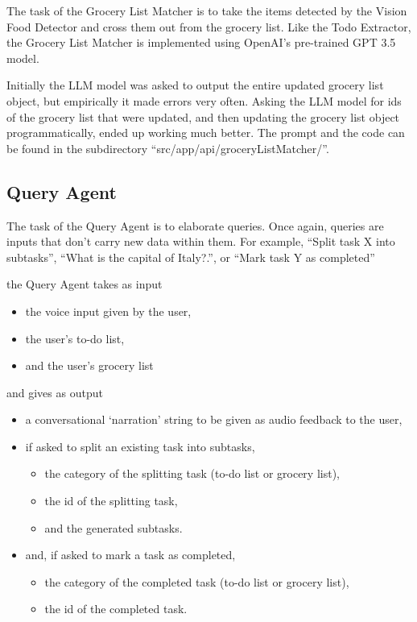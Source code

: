 \documentclass{article}
\begin{document}
The task of the Grocery List Matcher is to take the items detected by the Vision Food Detector and cross them out from the grocery list. Like the Todo Extractor, the Grocery List Matcher is implemented using OpenAI's pre-trained GPT 3.5 model.


Initially the LLM model was asked to output the entire updated grocery list object, but empirically it made errors very often.
Asking the LLM model for ids of the grocery list that were updated, and then updating the grocery list object programmatically, ended up working much better. The prompt and the code can be found in the subdirectory ``src/app/api/groceryListMatcher/''.

\subsection*{\color{draculayellow}Query Agent}

The task of the Query Agent is to elaborate queries. Once again, queries are inputs that don't carry new data within them. For example, ``Split task X into subtasks'', ``What is the capital of Italy?.'', or ``Mark task Y as completed''

the Query Agent takes as input
\begin{itemize}
  \item the voice input given by the user,
  \item the user's to-do list,
  \item and the user's grocery list
\end{itemize}
and gives as output
\begin{itemize}
  \item a conversational `narration' string to be given as audio feedback to the user,
  \item if asked to split an existing task into subtasks,
  \begin{itemize}
    \item the category of the splitting task (to-do list or grocery list),
    \item the id of the splitting task,
    \item and the generated subtasks.
  \end{itemize}
  \item and, if asked to mark a task as completed,
  \begin{itemize}
    \item the category of the completed task (to-do list or grocery list),
    \item the id of the completed task.
  \end{itemize}
\end{itemize}
\end{document}
